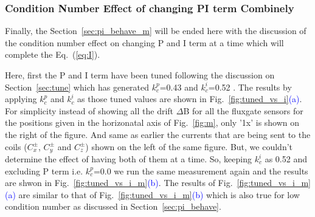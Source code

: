  

\subsubsection{Condition Number Effect of changing PI term Combinely}
Finally, the Section~\ref{sec:pi_behave_m} will be ended here with the discussion of the condition number effect on changing P and I term at a time which will complete the Eq.~(\ref{eq:I}).

Here, first the P and I term have been tuned following the discussion on Section~\ref{sec:tune} which has generated $k_c^p$=0.43 and $k_c^i$=0.52 . The results by applying $k_c^p$ and $k_c^i$ as those tuned values are shown in Fig.~\ref{fig:tuned_vs_i}\textcolor{blue}{(a)}. For simplicity instead of showing all the drift $\Delta$B for all the fluxgate sensors for the positions given in the horizonatal axis of Fig.~\ref{fig:m}, only '1x' is shown on the right of the figure. And same as earlier the currents  that are being sent to the coils ($C_x^\pm$, $C_y^\pm$ and $C_z^\pm$) shown on the left of the same figure. But, we couldn't determine the effect of having both of them at a time. So, keeping $k_c^i$ as 0.52 and excluding P term i.e. $k_c^p$=0.0 we run the same measurement again and the results are shwon in Fig.~\ref{fig:tuned_vs_i_m}\textcolor{blue}{(b)}. The results of Fig.~\ref{fig:tuned_vs_i_m}\textcolor{blue}{(a)} are similar to that of Fig.~\ref{fig:tuned_vs_i_m}\textcolor{blue}{(b)} which is also true for low condition number as discussed in Section~\ref{sec:pi_behave}. 


